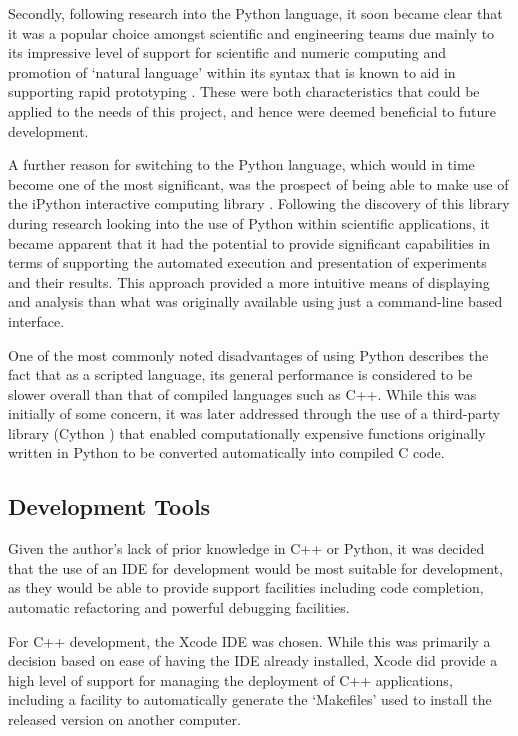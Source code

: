 Secondly, following research into the Python language, it soon became clear that it was a popular choice amongst scientific and engineering teams due mainly to its impressive level of support for scientific and numeric computing \cite{perez} and promotion of `natural language' within its syntax that is known to aid in supporting rapid prototyping \cite{ramanujam}. These were both characteristics that could be applied to the needs of this project, and hence were deemed beneficial to future development.


A further reason for switching to the Python language, which would in time become one of the most significant, was the prospect of being able to make use of the iPython interactive computing library \cite{ipython}. Following the discovery of this library during research looking into the use of Python within scientific applications, it became apparent that it had the potential to provide significant capabilities in terms of supporting the automated execution and presentation of experiments and their results. This approach provided a more  intuitive means of displaying and analysis than what was originally available using just a command-line based interface. 

One of the most commonly noted disadvantages of using Python describes the fact that as a scripted language, its general performance is considered to be slower overall than that of compiled languages such as C++. While this was initially of some concern, it was later addressed through the use of a third-party library (Cython \cite{cython}) that enabled computationally expensive functions originally written in Python to be converted automatically into compiled C code.

\subsection{Development Tools}
\label{develtools}

Given the author's lack of prior knowledge in C++ or Python, it was decided that the use of an IDE for development would be most suitable for development, as they would be able to provide support facilities including code completion, automatic refactoring and powerful debugging facilities. 

For C++ development, the Xcode IDE \cite{xcode} was chosen. While this was primarily a decision based on ease of having the IDE already installed, Xcode did provide a high level of support for managing the deployment of C++ applications, including a facility to automatically generate the `Makefiles' used to install the released version on another computer. 


